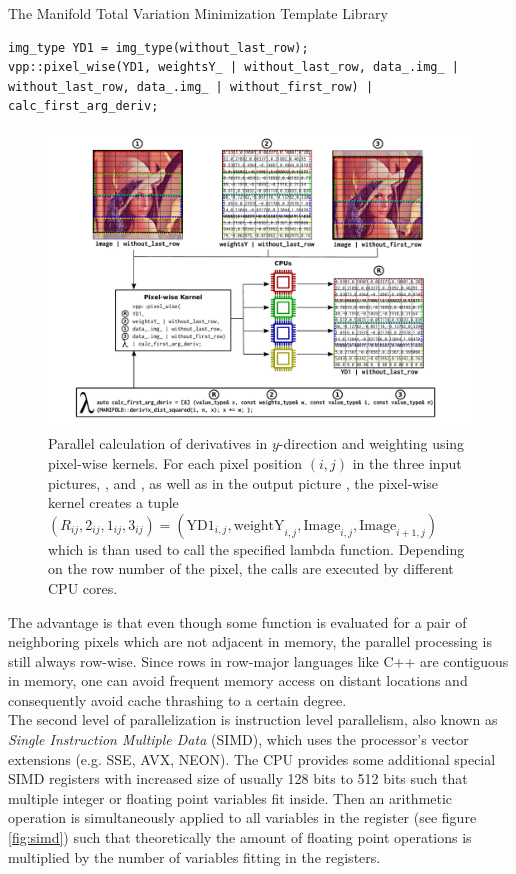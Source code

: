 \begin{chapter}{The Manifold Total Variation Minimization Template Library}
\begin{lstlisting}[label=code:pixelwise_demo,caption={Pixel-wise forward derivative computation}]
img_type YD1 = img_type(without_last_row);
vpp::pixel_wise(YD1, weightsY_ | without_last_row, data_.img_ | without_last_row, data_.img_ | without_first_row) | calc_first_arg_deriv;
\end{lstlisting}

\begin{figure}[h!]
        \centering
	    \includegraphics[width=1.0\linewidth]{./figures/library/pixelwise_kernel.pdf}
	\caption[Calculation using pixel-wise kernels]{Parallel calculation of derivatives in $y$-direction and weighting using pixel-wise kernels.
	    For each pixel position $(i,j)$ in the three input pictures, ,  and , as well as in the output picture
	    , the pixel-wise kernel creates a tuple $(R_{ij}, 2_{ij}, 1_{ij}, 3_{ij})=(\text{YD1}_{i,j},\text{weightY}_{i,j},\text{Image}_{i,j},\text{Image}_{i+1,j})$
	    which is than used to call the specified lambda function. Depending on the row number of the pixel, the calls are executed by different CPU cores.
	}
	\label{fig:pixelwise_kernel}
\end{figure}

The advantage is that even though some function is evaluated for a pair of neighboring pixels which are not adjacent in memory, the parallel processing is still
always row-wise. Since rows in row-major languages like C++ are contiguous in memory, one can avoid frequent memory access on distant locations and consequently avoid cache thrashing to a certain degree.\\

The second level of parallelization is instruction level parallelism, also known as \textit{Single Instruction Multiple Data} (SIMD), which uses the
processor's vector extensions (e.g. SSE, AVX, NEON).
The CPU provides some additional special SIMD registers with increased size of usually 128 bits to 512 bits such that multiple integer or floating point variables fit inside.
Then an arithmetic operation is simultaneously applied to all variables in the register (see figure \ref{fig:simd}) such that theoretically the amount of floating point operations is multiplied by the number
of variables fitting in the registers. \\


\end{chapter}
